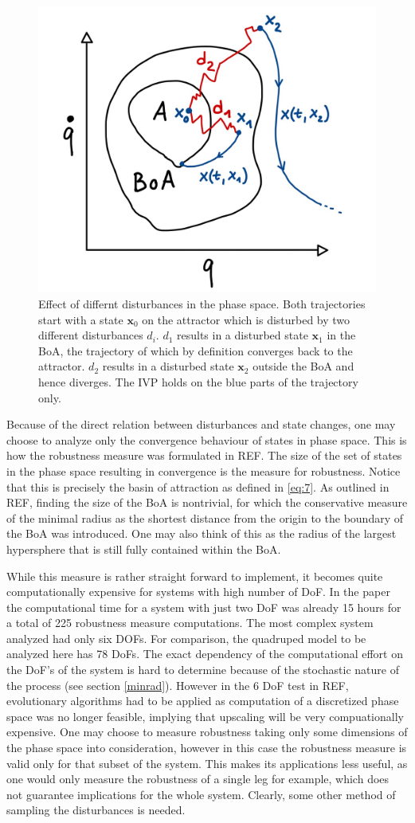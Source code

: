    \begin{figure}
    \centering
    \includegraphics[width=.5\textwidth]{figures/conv_div_viz_crop.png}
    \caption[Convergence and Divergence in the Phase Space]{Effect of differnt disturbances in the phase space. Both trajectories start with a state $\mathbf{x}_0$ on the attractor which is disturbed by two different disturbances $d_i$. $d_1$ results in a disturbed state $\mathbf{x}_1$ in the BoA, the trajectory of which by definition converges back to the attractor. $d_2$ results in a disturbed state $\mathbf{x}_2$ outside the BoA and hence diverges. The IVP holds on the blue parts of the trajectory only.}
    \label{convdiv}
    \end{figure}

    Because of the direct relation between disturbances and state changes, one may choose to analyze only the convergence behaviour of states in phase space. This is how the robustness measure was formulated in REF. The size of the set of states in the phase space resulting in convergence is the measure for robustness. Notice that this is precisely the basin of attraction as defined in \ref{eq:7}. As outlined in REF, finding the size of the BoA is nontrivial, for which the conservative measure of the minimal radius as the shortest distance from the origin to the boundary of the BoA was introduced. One may also think of this as the radius of the largest hypersphere that is still fully contained within the BoA.

    While this measure is rather straight forward to implement, it becomes quite computationally expensive for systems with high number of DoF. 
    In the paper the computational time for a system with just two DoF was already 15 hours for a total of 225 robustness measure computations. The most complex system analyzed had only six DOFs. For comparison, the quadruped model to be analyzed here has 78 DoFs. The exact dependency of the computational effort on the DoF's of the system is hard to determine because of the stochastic nature of the process (see section \ref{minrad}). However in the 6 DoF test in REF, evolutionary algorithms had to be applied as computation of a discretized phase space was no longer feasible, implying that upscaling will be very compuationally expensive. One may choose to measure robustness taking only some dimensions of the phase space into consideration, however in this case the robustness measure is valid only for that subset of the system. This makes its applications less useful, as one would only measure the robustness of a single leg for example, which does not guarantee implications for the whole system. Clearly, some other method of sampling the disturbances is needed.

